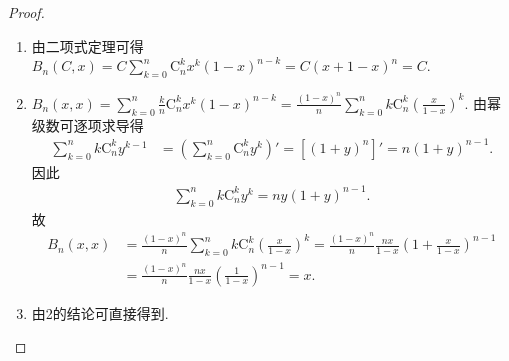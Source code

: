 \documentclass[../../main.tex]{subfiles}%
\begin{document}
\begin{proof}
\begin{enumerate}
\item 由二项式定理可得$B_n(C,x)=C\sum_{k=0}^n{\mathrm{C}_{n}^{k}x^k\left( 1-x \right) ^{n-k}}=C\left( x+1-x \right) ^n=C.$

\item $B_n(x,x)=\sum_{k=0}^n{\frac{k}{n}\mathrm{C}_{n}^{k}x^k\left( 1-x \right) ^{n-k}}=\frac{\left( 1-x \right) ^n}{n}\sum_{k=0}^n{k\mathrm{C}_{n}^{k}\left( \frac{x}{1-x} \right) ^k}$.
由幂级数可逐项求导得
\begin{align*}
\sum_{k=0}^n{k\mathrm{C}_{n}^{k}y^{k-1}}&=\left( \sum_{k=0}^n{\mathrm{C}_{n}^{k}y^k} \right) ' =\left[ \left( 1+y \right) ^n \right] ' =n\left( 1+y \right) ^{n-1}.
\end{align*}
因此
\begin{align*}
\sum_{k=0}^n{k\mathrm{C}_{n}^{k}y^k}=ny\left( 1+y \right) ^{n-1}.
\end{align*}
故
\begin{align*}
B_n(x,x)&=\frac{\left( 1-x \right) ^n}{n}\sum_{k=0}^n{k\mathrm{C}_{n}^{k}\left( \frac{x}{1-x} \right) ^k}=\frac{\left( 1-x \right) ^n}{n}\frac{nx}{1-x}\left( 1+\frac{x}{1-x} \right) ^{n-1}\\
&=\frac{\left( 1-x \right) ^n}{n}\frac{nx}{1-x}\left( \frac{1}{1-x} \right) ^{n-1}=x.
\end{align*}

\item 由2的结论可直接得到.


\end{enumerate}
\end{proof}
\end{document}
